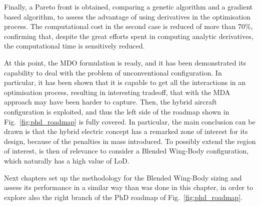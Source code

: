 Finally, a Pareto front is obtained, comparing a genetic algorithm and a gradient based algorithm, to assess the advantage of using derivatives in the optimisation process. 
The computational cost in the second case is reduced of more than 70\%, confirming that, despite the great efforts spent in computing analytic derivatives, the computational time is sensitively reduced. 

At this point, the MDO formulation is ready, and it has been demonstrated its capability to deal with the problem of unconventional configuration. 
In particular, it has been shown that it is capable to get all the interactions in an optimisation process, resulting in interesting tradeoff, that with the MDA approach may have been harder to capture. 
Then, the hybrid aircraft configuration is exploited, and thus the left side of the roadmap shown in Fig.~\ref{fig:phd_roadmap} is fully covered. 
In particular, the main conclusion can be drawn is that the hybrid electric concept has a remarked zone of interest for its design, because of the penalties in mass introduced. 
To possibly extend the region of interest, is then of relevance to consider a Blended Wing-Body configuration, which naturally has a high value of LoD. 

Next chapters set up the methodology for the Blended Wing-Body sizing and assess its performance in a similar way than was done in this chapter, in order to explore also the right branch of the PhD roadmap of Fig.~\ref{fig:phd_roadmap}.

\clearpage

